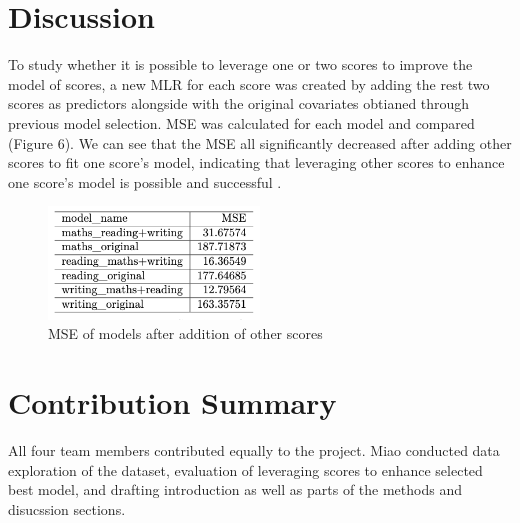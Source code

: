 \documentclass[
  12pt,
]{article}
\begin{document}
\newpage

\hypertarget{discussion}{%
\section{Discussion}\label{discussion}}

To study whether it is possible to leverage one or two scores to improve
the model of scores, a new MLR for each score was created by adding the
rest two scores as predictors alongside with the original covariates
obtianed through previous model selection. MSE was calculated for each
model and compared (Figure 6). We can see that the MSE all significantly
decreased after adding other scores to fit one score's model, indicating
that leveraging other scores to enhance one score's model is possible
and successful .

\begin{figure}
  \centering
  \includegraphics[width=0.5\textwidth]{table3.png}
  \caption{MSE of models after addition of other scores}
\end{figure}

\hypertarget{contribution-summary}{%
\section{Contribution Summary}\label{contribution-summary}}

All four team members contributed equally to the project. Miao conducted
data exploration of the dataset, evaluation of leveraging scores to
enhance selected best model, and drafting introduction as well as parts
of the methods and disucssion sections.
\end{document}
